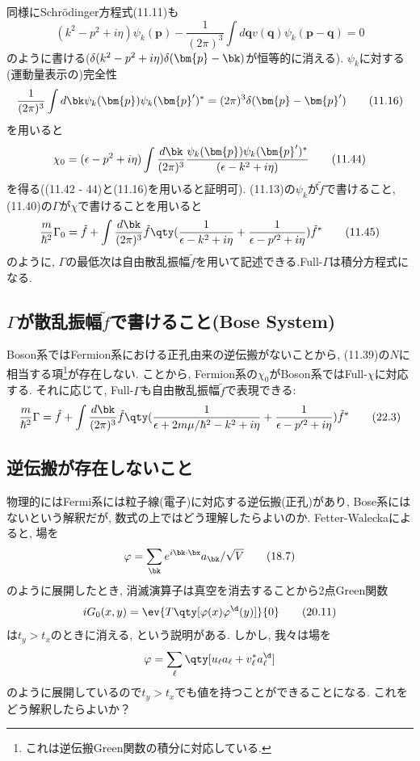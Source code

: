 \documentclass[10.5pt,a4paper]{jreport}
\begin{document}
同様にSchr\"odinger方程式(11.11)も
\begin{equation}
  (k^2 - p^2 + i\eta)\psi_k(\bm{p}) - \frac{1}{(2\pi)^3}\int d\bm{q} v(\bm{q})\psi_k(\bm{p} - \bm{q}) = 0\tag{11.43}
\end{equation}
のように書ける($\delta(k^2 - p^2 + i\eta)\delta(\bm{p} - \bk)$が恒等的に消える). $\psi_k$に対する(運動量表示の)完全性
\begin{equation}
  \frac{1}{(2\pi)^3}\int d\bk \psi_k(\bm{p})\psi_k(\bm{p}')^* = (2\pi)^3\delta(\bm{p} - \bm{p}')\tag{11.16}
\end{equation}
を用いると
\begin{equation}
  \chi_0 = (\epsilon - p^2 + i\eta)\int \frac{d\bk}{(2\pi)^3}\frac{\psi_k(\bm{p})\psi_k(\bm{p}')^*}{(\epsilon - k^2 + i\eta)}\tag{11.44}
\end{equation}
を得る((11.42 - 44)と(11.16)を用いると証明可). (11.13)の$\psi_k$が$\tilde{f}$で書けること, (11.40)の$\Gamma$が$\chi$で書けることを用いると
\begin{equation}
  \frac{m}{\hbar^2}\Gamma_0 = \tilde{f} + \int\frac{d\bk}{(2\pi)^3}\tilde{f}\qty(\frac{1}{\epsilon - k^2 + i\eta} + \frac{1}{\epsilon - p'^2 + i\eta})\tilde{f}^*\tag{11.45}
\end{equation}
のように, $\Gamma$の最低次は自由散乱振幅$\tilde{f}$を用いて記述できる.Full-$\Gamma$は積分方程式になる.
\subsection{$\Gamma$が散乱振幅$\tilde{f}$で書けること(Bose System)}
Boson系ではFermion系における正孔由来の逆伝搬がないことから, (11.39)の$N$に相当する項\footnote{これは逆伝搬Green関数の積分に対応している. }が存在しない. ことから, Fermion系の$\chi_0$がBoson系ではFull-$\chi$に対応する. それに応じて, Full-$\Gamma$も自由散乱振幅$\tilde{f}$で表現できる:
\begin{equation}
  \frac{m}{\hbar^2}\Gamma= \tilde{f} + \int\frac{d\bk}{(2\pi)^3}\tilde{f}\qty(\frac{1}{\epsilon + 2m\mu/\hbar^2 - k^2 + i\eta} + \frac{1}{\epsilon - p'^2 + i\eta})\tilde{f}^*\tag{22.3}
\end{equation}
\subsection{逆伝搬が存在しないこと}
物理的にはFermi系には粒子線(電子)に対応する逆伝搬(正孔)があり, Bose系にはないという解釈だが, 数式の上ではどう理解したらよいのか. Fetter-Waleckaによると, 場を
\begin{equation}
  \varphi = \sum_{\bk} e^{i\bk\cdot\bx }a_{\bk}/\sqrt{V}\tag{18.7}
\end{equation}
のように展開したとき, 消滅演算子は真空を消去することから2点Green関数
\begin{equation}
  iG_0(x, y) =  \ev{T\qty[\varphi(x)\varphi^\d(y)]}{0}\tag{20.11}
\end{equation}
は$t_y>t_x$のときに消える, という説明がある. しかし, 我々は場を
\begin{eqnarray}
  \varphi = \sum_\ell \qty[u_\ell a_\ell + v_\ell^*a^\d_\ell]
\end{eqnarray}
のように展開しているので$t_y>t_x$でも値を持つことができることになる. これをどう解釈したらよいか？
\end{document}
